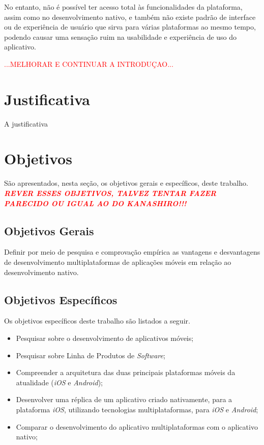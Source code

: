 No entanto, não é possível ter acesso total às funcionalidades da plataforma, assim como no desenvolvimento nativo, e também não existe padrão de interface ou de experiência de usuário que sirva
para várias plataformas ao mesmo tempo, podendo causar uma sensação ruim na usabilidade e experiência de uso do aplicativo.

\textcolor{red}{...MELHORAR E CONTINUAR A INTRODUÇAO...}

\section{Justificativa}\label{sec:justificativa}

A justificativa

\section{Objetivos} \label{sec:objetivos}

São apresentados, nesta seção, os objetivos gerais e específicos, deste trabalho. 
\textcolor{red}{\textbf{\textit{REVER ESSES OBJETIVOS, TALVEZ TENTAR FAZER PARECIDO OU IGUAL AO DO KANASHIRO!!!}}}

\subsection{Objetivos Gerais}  \label{subsec:objetivos_gerais}

Definir por meio de pesquisa e comprovação empírica as vantagens e desvantagens de desenvolvimento multiplataformas de aplicações móveis em relação ao desenvolvimento nativo. 

\subsection{Objetivos Específicos}  \label{subsec:objetivos_especificos}

Os objetivos específicos deste trabalho são listados a seguir.

\begin{itemize}
    \item Pesquisar sobre o desenvolvimento de aplicativos móveis;
    \item Pesquisar sobre Linha de Produtos de \textit{Software};
    \item Compreender a arquitetura das duas principais plataformas móveis da atualidade (\textit{iOS} e \textit{Android});
    \item Desenvolver uma réplica de um aplicativo criado nativamente, para a plataforma \textit{iOS}, utilizando tecnologias multiplataformas, para \textit{iOS} e \textit{Android};
    \item Comparar o desenvolvimento do aplicativo multiplataformas com o aplicativo nativo;
\end{itemize}

